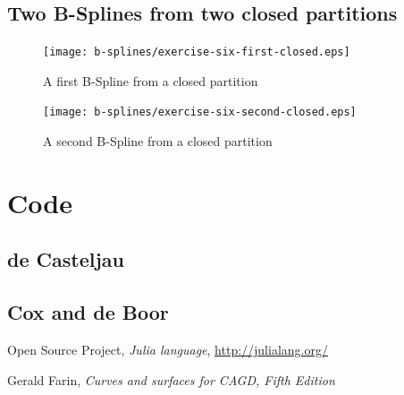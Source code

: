 \documentclass{article}
\begin{document}
\subsection{Two B-Splines from two closed partitions}
\begin{figure}[h!]
  \centering
  \texttt{[image: b-splines/exercise-six-first-closed.eps]}
  \caption{A first B-Spline from a closed partition }
  \label{fig:bspline-exercise-six-first}
\end{figure}

\begin{figure}[h!]
  \centering
  \texttt{[image: b-splines/exercise-six-second-closed.eps]}
  \caption{A second B-Spline from a closed partition }
  \label{fig:bspline-exercise-six-second}
\end{figure}


\section{Code}

\subsection{de Casteljau}
\label{sec:deCasteljau-code}


\subsection{Cox and de Boor}
\label{sec:Cox-deBoor-code}


\newpage

\begin{thebibliography}{}

 Open Source Project,
  \emph{Julia language}, \url{http://julialang.org/}

 Gerald Farin,
  \textit{Curves and surfaces for CAGD, Fifth Edition}


\end{thebibliography}
\end{document}
